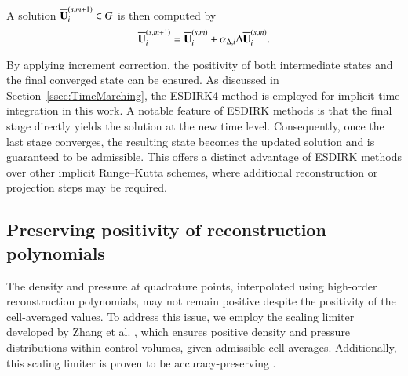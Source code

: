 A solution $\overline{\mathbf{U}}^{\left(s,m+1\right)}_i \in G$ is then computed by
\begin{equation}
\label{eq:increment-correction}
    \overline{\mathbf{U}}_i^{\left(s,m+1\right)} = \overline{\mathbf{U}}_i^{\left(s,m\right)} + \alpha_{\mathrm\Delta,i} \mathrm\Delta \overline{\mathbf{U}}_i^{\left(s,m\right)}.
\end{equation}

By applying increment correction, the positivity of both intermediate states and the final converged state can be ensured. As discussed in Section~\ref{ssec:TimeMarching}, the ESDIRK4 method is employed for implicit time integration in this work. A notable feature of ESDIRK methods is that the final stage directly yields the solution at the new time level. Consequently, once the last stage converges, the resulting state becomes the updated solution and is guaranteed to be admissible. This offers a distinct advantage of ESDIRK methods over other implicit Runge–Kutta schemes, where additional reconstruction or projection steps may be required.

\subsection{Preserving positivity of reconstruction polynomials}
\label{ssec:rec-pp-limiter}

The density and pressure at quadrature points, interpolated using high-order reconstruction polynomials, may not remain positive despite the positivity of the cell-averaged values. To address this issue, we employ the scaling limiter developed by Zhang et al. \cite{zhang2010maximum,zhang2010positivity,zhang2012positivity}, which ensures positive density and pressure distributions within control volumes, given admissible cell-averages. Additionally, this scaling limiter is proven to be accuracy-preserving \cite{zhang2010positivity}.


